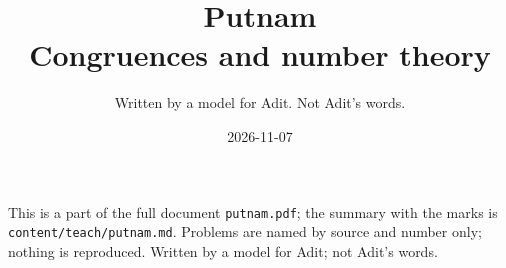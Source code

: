 
\title{Putnam\\[0.3em]\large Congruences and number theory}
\author{Written by a model for Adit. Not Adit's words.}
\date{2026-11-07}

\maketitle
\noindent\small This is a part of the full document \texttt{putnam.pdf}; the summary with the marks is \texttt{content/teach/putnam.md}. Problems are named by source and number only; nothing is reproduced. Written by a model for Adit; not Adit's words.\normalsize



